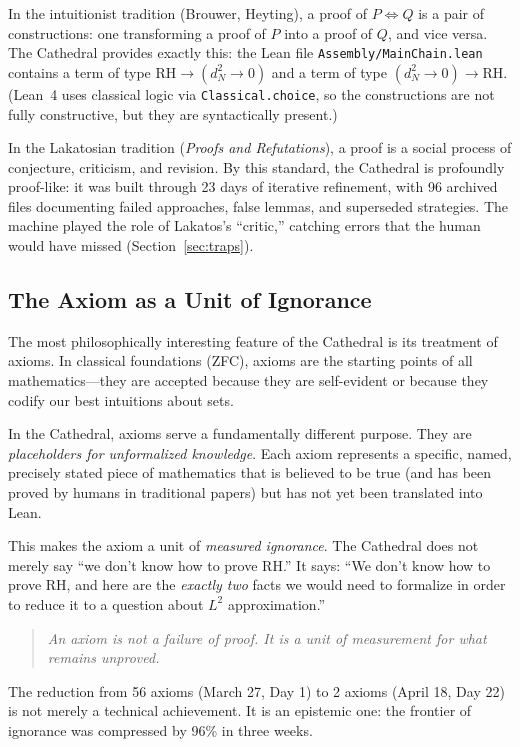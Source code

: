 \documentclass[11pt,a4paper]{article}
\newcommand{\RH}{\ensuremath{\mathrm{RH}}}
\begin{document}
In the intuitionist tradition (Brouwer, Heyting), a proof of $P \iff Q$
is a pair of constructions: one transforming a proof of $P$ into a
proof of $Q$, and vice versa. The Cathedral provides exactly this:
the Lean file \texttt{Assembly/MainChain.lean} contains a term of
type $\RH \to (d_N^2 \to 0)$ and a term of type
$(d_N^2 \to 0) \to \RH$. (Lean~4 uses classical logic via
\texttt{Classical.choice}, so the constructions are not fully
constructive, but they are syntactically present.)

In the Lakatosian tradition (\emph{Proofs and Refutations}), a proof
is a social process of conjecture, criticism, and revision. By this
standard, the Cathedral is profoundly proof-like: it was built through
23 days of iterative refinement, with 96 archived files documenting
failed approaches, false lemmas, and superseded strategies. The
machine played the role of Lakatos's ``critic,'' catching errors that
the human would have missed (Section~\ref{sec:traps}).

\subsection{The Axiom as a Unit of Ignorance}

The most philosophically interesting feature of the Cathedral is its
treatment of axioms. In classical foundations (ZFC), axioms are the
starting points of all mathematics---they are accepted because they
are self-evident or because they codify our best intuitions about
sets.

In the Cathedral, axioms serve a fundamentally different purpose. They
are \emph{placeholders for unformalized knowledge}. Each axiom
represents a specific, named, precisely stated piece of mathematics
that is believed to be true (and has been proved by humans in
traditional papers) but has not yet been translated into Lean.

This makes the axiom a unit of \emph{measured ignorance}. The
Cathedral does not merely say ``we don't know how to prove \RH.''
It says: ``We don't know how to prove \RH, and here are the
\emph{exactly two} facts we would need to formalize in order to
reduce it to a question about $L^2$ approximation.''

\begin{quote}
\emph{An axiom is not a failure of proof. It is a unit of measurement
for what remains unproved.}
\end{quote}

The reduction from 56 axioms (March 27, Day 1) to 2 axioms (April 18,
Day 22) is not merely a technical achievement. It is an epistemic
one: the frontier of ignorance was compressed by 96\% in three weeks.
\end{document}
